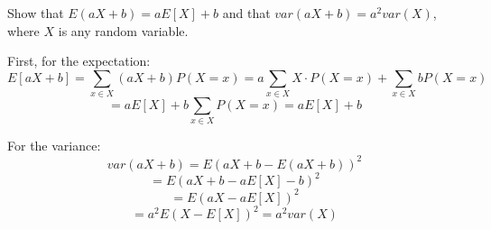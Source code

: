 \question Show that $E(aX + b) = aE[X] + b$ and that $var(aX + b) = a^2 var(X)$, where $X$ is any random variable.

\begin{solution}
First, for the expectation:
$$E[aX + b] = \sum_{x \in X} (aX + b) P(X = x)= a\sum_{x \in X} X \cdot P(X = x) + \sum_{x \in X} b P(X = x)$$$$= aE[X] + b\sum_{x \in X} P(X = x) = aE[X] + b$$

\vspace{2 mm}
For the variance:
$$var(aX + b) = E(aX + b - E(aX + b))^2$$
$$= E(aX + b - aE[X] - b)^2$$
$$= E(aX - aE[X])^2$$
$$= a^2 E(X - E[X])^2 = a^2 var(X)$$

\end{solution}